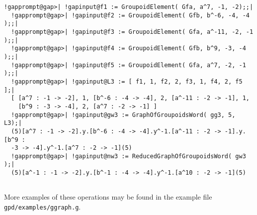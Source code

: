 \documentclass[a4paper,11pt]{report}
\begin{document}
{{\begin{Verbatim}[commandchars=!@|,fontsize=\small,frame=single,label=Example]
  !gapprompt@gap>| !gapinput@f1 := GroupoidElement( Gfa, a^7, -1, -2);;|
  !gapprompt@gap>| !gapinput@f2 := GroupoidElement( Gfb, b^-6, -4, -4 );;|
  !gapprompt@gap>| !gapinput@f3 := GroupoidElement( Gfa, a^-11, -2, -1 );;|
  !gapprompt@gap>| !gapinput@f4 := GroupoidElement( Gfb, b^9, -3, -4 );;|
  !gapprompt@gap>| !gapinput@f5 := GroupoidElement( Gfa, a^7, -2, -1 );;|
  !gapprompt@gap>| !gapinput@L3 := [ f1, 1, f2, 2, f3, 1, f4, 2, f5 ];|
  [ [a^7 : -1 -> -2], 1, [b^-6 : -4 -> -4], 2, [a^-11 : -2 -> -1], 1, 
    [b^9 : -3 -> -4], 2, [a^7 : -2 -> -1] ]
  !gapprompt@gap>| !gapinput@gw3 := GraphOfGroupoidsWord( gg3, 5, L3);|
  (5)[a^7 : -1 -> -2].y.[b^-6 : -4 -> -4].y^-1.[a^-11 : -2 -> -1].y.[b^9 : 
  -3 -> -4].y^-1.[a^7 : -2 -> -1](5)
  !gapprompt@gap>| !gapinput@nw3 := ReducedGraphOfGroupoidsWord( gw3 );|
  (5)[a^-1 : -1 -> -2].y.[b^-1 : -4 -> -4].y^-1.[a^10 : -2 -> -1](5)
  
\end{Verbatim}
 }

 More examples of these operations may be found in the example file \texttt{gpd/examples/ggraph.g}. }

            
\end{document}

